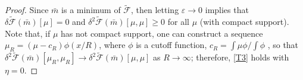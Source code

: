 \documentclass[10pt,a4paper,nouppercase,nowrite]{article}
\numberwithin{equation}{section}
\newcommand{\di}{{\rm d}}
\newcommand{\eps}{\varepsilon}
\newcommand{\F}{\widetilde{\mathcal{F}}}
\theoremstyle{definition}
\begin{document}
\begin{proof}
%	
%	
%	
	Since $\bar{m}$ is a minimum of $\F$, then letting $\eps \to 0$ implies that $\delta\F(\bar m)[\mu] = 0$ and $\delta^2\F(\bar m)[\mu, \mu] \ge 0$ for all $\mu$ (with compact support). Note that, if $\mu$ has not compact support, one can construct a sequence $\mu_R= (\mu -c_R)\phi(x/R)$, where $\phi$ is a cutoff function, $c_R = \int \mu \phi/\int \phi$ , so that $\delta^2\F(\bar m)[\mu_R, \mu_R] \to \delta^2\F(\bar m)[\mu, \mu]$ as $R \to \infty$; therefore, \eqref{T3} holds with $\eta = 0$.
	

\end{proof}
\end{document}
